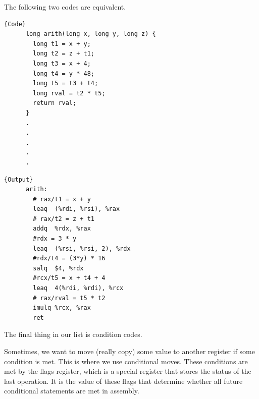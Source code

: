   \begin{example}
    \label{ex:harder-arithmetic-example}
    The following two codes are equivalent. 

    \noindent\begin{minipage}{.5\textwidth}
    \begin{lstlisting}[]{Code}
      long arith(long x, long y, long z) {
        long t1 = x + y; 
        long t2 = z + t1; 
        long t3 = x + 4; 
        long t4 = y * 48; 
        long t5 = t3 + t4;
        long rval = t2 * t5; 
        return rval; 
      }
      .
      .
      .
      .
      .
    \end{lstlisting}
    \end{minipage}
    \hfill
    \begin{minipage}{.49\textwidth}
    \begin{lstlisting}[]{Output}
      arith: 
        # rax/t1 = x + y
        leaq  (%rdi, %rsi), %rax
        # rax/t2 = z + t1
        addq  %rdx, %rax
        #rdx = 3 * y 
        leaq  (%rsi, %rsi, 2), %rdx
        #rdx/t4 = (3*y) * 16
        salq  $4, %rdx 
        #rcx/t5 = x + t4 + 4
        leaq  4(%rdi, %rdi), %rcx 
        # rax/rval = t5 * t2
        imulq %rcx, %rax 
        ret 
    \end{lstlisting}
    \end{minipage}
  \end{example}

  The final thing in our list is condition codes. 

  Sometimes, we want to move (really copy) some value to another register if some condition is met. This is where we use conditional moves. These conditions are met by the flags register, which is a special register that stores the status of the last operation. It is the value of these flags that determine whether all future conditional statements are met in assembly. 
  
